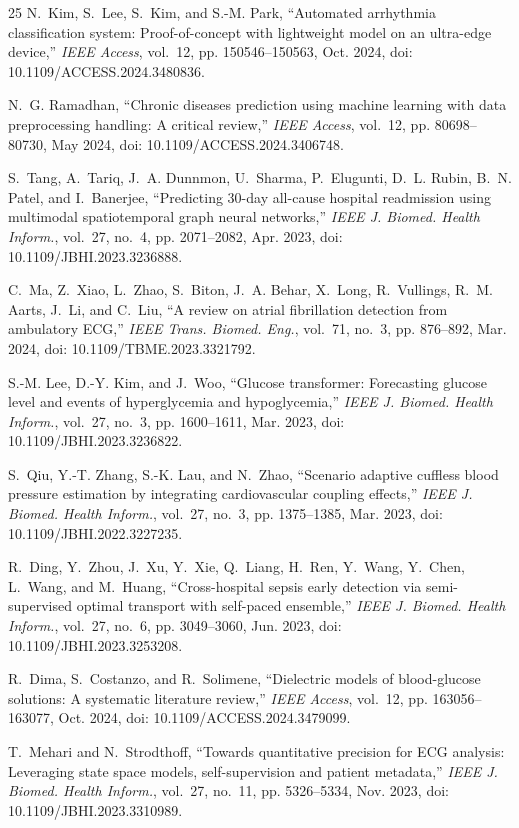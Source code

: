\documentclass[conference]{IEEEtran}
\begin{document}
\begin{thebibliography}{25}
N.~Kim, S.~Lee, S.~Kim, and S.-M. Park, ``Automated arrhythmia classification system: Proof-of-concept with lightweight model on an ultra-edge device,'' \emph{IEEE Access}, vol.~12, pp. 150546--150563, Oct. 2024, doi: 10.1109/ACCESS.2024.3480836.

N.~G. Ramadhan, ``Chronic diseases prediction using machine learning with data preprocessing handling: A critical review,'' \emph{IEEE Access}, vol.~12, pp. 80698--80730, May 2024, doi: 10.1109/ACCESS.2024.3406748.

S.~Tang, A.~Tariq, J.~A. Dunnmon, U.~Sharma, P.~Elugunti, D.~L. Rubin, B.~N. Patel, and I.~Banerjee, ``Predicting 30-day all-cause hospital readmission using multimodal spatiotemporal graph neural networks,'' \emph{IEEE J. Biomed. Health Inform.}, vol.~27, no.~4, pp. 2071--2082, Apr. 2023, doi: 10.1109/JBHI.2023.3236888.

C.~Ma, Z.~Xiao, L.~Zhao, S.~Biton, J.~A. Behar, X.~Long, R.~Vullings, R.~M. Aarts, J.~Li, and C.~Liu, ``A review on atrial fibrillation detection from ambulatory ECG,'' \emph{IEEE Trans. Biomed. Eng.}, vol.~71, no.~3, pp. 876--892, Mar. 2024, doi: 10.1109/TBME.2023.3321792.

S.-M. Lee, D.-Y. Kim, and J.~Woo, ``Glucose transformer: Forecasting glucose level and events of hyperglycemia and hypoglycemia,'' \emph{IEEE J. Biomed. Health Inform.}, vol.~27, no.~3, pp. 1600--1611, Mar. 2023, doi: 10.1109/JBHI.2023.3236822.

S.~Qiu, Y.-T. Zhang, S.-K. Lau, and N.~Zhao, ``Scenario adaptive cuffless blood pressure estimation by integrating cardiovascular coupling effects,'' \emph{IEEE J. Biomed. Health Inform.}, vol.~27, no.~3, pp. 1375--1385, Mar. 2023, doi: 10.1109/JBHI.2022.3227235.

R.~Ding, Y.~Zhou, J.~Xu, Y.~Xie, Q.~Liang, H.~Ren, Y.~Wang, Y.~Chen, L.~Wang, and M.~Huang, ``Cross-hospital sepsis early detection via semi-supervised optimal transport with self-paced ensemble,'' \emph{IEEE J. Biomed. Health Inform.}, vol.~27, no.~6, pp. 3049--3060, Jun. 2023, doi: 10.1109/JBHI.2023.3253208.

R.~Dima, S.~Costanzo, and R.~Solimene, ``Dielectric models of blood-glucose solutions: A systematic literature review,'' \emph{IEEE Access}, vol.~12, pp. 163056--163077, Oct. 2024, doi: 10.1109/ACCESS.2024.3479099.

T.~Mehari and N.~Strodthoff, ``Towards quantitative precision for ECG analysis: Leveraging state space models, self-supervision and patient metadata,'' \emph{IEEE J. Biomed. Health Inform.}, vol.~27, no.~11, pp. 5326--5334, Nov. 2023, doi: 10.1109/JBHI.2023.3310989.

\end{thebibliography}
\end{document}

